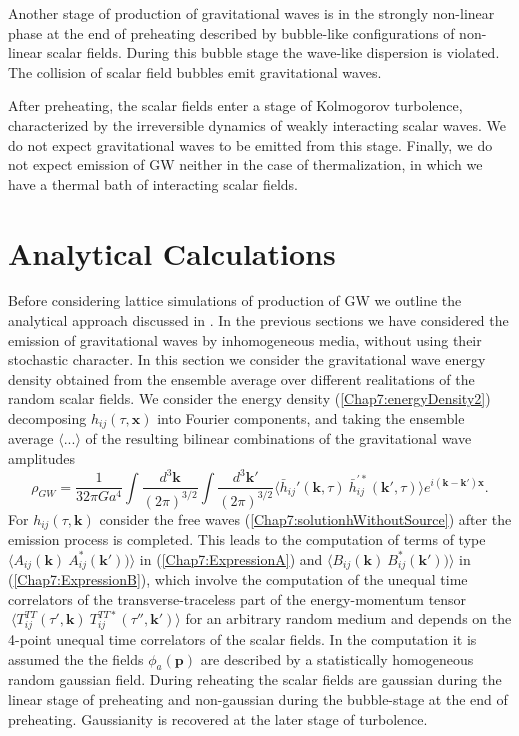 \documentclass[11pt,a4paper,twoside]{book}
\begin{document}
 Another stage of production of gravitational waves is in the strongly non-linear phase at the end of preheating described by bubble-like configurations of non-linear scalar fields. During this bubble stage the wave-like dispersion is violated. The collision of scalar field bubbles emit gravitational waves.
 
 After preheating, the scalar fields enter a stage of Kolmogorov turbolence, characterized by the irreversible dynamics of weakly interacting scalar waves. We do not expect gravitational waves to be emitted from this stage. Finally, we do not expect emission of  GW neither in the case of thermalization, in which we have a thermal bath of interacting scalar fields.
 \section{Analytical Calculations}
 Before considering lattice simulations of production of GW we outline the analytical approach discussed in \cite{Chap7:GreenMethod}. In the previous sections we have considered the emission of gravitational waves by inhomogeneous media, without using their stochastic character. In this section we consider the gravitational wave energy density obtained from the ensemble average over different realitations of the random scalar fields. We consider the energy density (\ref{Chap7:energyDensity2}) decomposing $ h_{ij}(\tau,\textbf{x}) $ into Fourier components, and taking the ensemble average  $ \langle ...\rangle  $ of the resulting bilinear combinations of the gravitational wave amplitudes
 \begin{equation}
\label{Chap7:energyDensity3}
\rho_{GW}=\frac{1}{32\pi G a^{4}} \int \frac{d^{3} \textbf{k}}{(2\pi)^{3/2}} \int \frac{d^{3} \textbf{k}'}{(2\pi)^{3/2}} \langle \bar{h}_{ij}'(\textbf{k},\tau)\ \bar{h}^{'*}_{ij}(\textbf{k}',\tau)\rangle e^{i(\textbf{k}-\textbf{k}')\textbf{x}}.
 \end{equation}
 For $ h_{ij}(\tau,\textbf{k}) $ consider the free waves (\ref{Chap7:solutionhWithoutSource}) after the emission process is completed. This leads to the computation of terms of type $ \langle A_{ij}(\textbf{k})\ A^{*}_{ij}(\textbf{k}'))\rangle  $ in (\ref{Chap7:ExpressionA}) and  $ \langle B_{ij}(\textbf{k})\ B^{*}_{ij}(\textbf{k}'))\rangle  $ in (\ref{Chap7:ExpressionB}),  which involve the computation of the unequal time correlators of the transverse-traceless  part of the energy-momentum tensor $\  \langle T^{TT}_{ij}(\tau',\textbf{k})\ T^{TT*}_{ij}(\tau'',\textbf{k}')\rangle  $ for an arbitrary random medium and depends on the 4-point unequal time correlators of the scalar fields. In the computation it is assumed the the fields $ \phi_{a}(\textbf{p}) $ are described by a statistically homogeneous random gaussian field. During reheating the scalar fields  are gaussian during the linear stage of preheating and non-gaussian during the bubble-stage at the end of preheating. Gaussianity is recovered at the later stage of turbolence.
 
\end{document}
